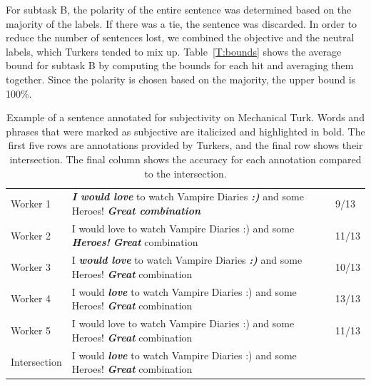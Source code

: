 For subtask B, the polarity of the entire sentence was determined based on the majority of the labels. If there was a tie, the sentence was discarded. In order to reduce the number of sentences lost, we combined the objective and the neutral labels, which Turkers tended to mix up. Table~\ref{T:bounds} shows the average bound for subtask B by computing the bounds for each hit and averaging them together. Since the polarity is chosen based on the majority, the upper bound is 100\%.

 \begin{table}[t]
\centering
\small
\begin{tabular}{|l|l|l|}
\hline
Worker 1 & \textbf{\textit{I would love}} to watch Vampire Diaries \textbf{\textit{:)}} and some Heroes! \textbf{\textit{Great combination}} & 9/13 \\
Worker 2 & I would love to watch Vampire Diaries :) and some \textbf{\textit{Heroes!}} \textbf{\textit{Great}} combination & 11/13 \\
Worker 3 & I \textbf{\textit{would love}} to watch Vampire Diaries \textbf{\textit{:)}} and some Heroes! \textbf{\textit{Great}} combination & 10/13 \\
Worker 4 & I would \textbf{\textit{love}} to watch Vampire Diaries :) and some Heroes! \textbf{\textit{Great}} combination & 13/13 \\
Worker 5 & I would love to watch Vampire Diaries :) and some Heroes! \textbf{\textit{Great}} combination & 11/13\\
\hline
Intersection & I would \textbf{\textit{love}} to watch Vampire Diaries :) and some Heroes! \textbf{\textit{Great}} combination & \\
\hline
\end{tabular}
\caption{Example of a sentence annotated for subjectivity on Mechanical Turk. Words and phrases that were marked as subjective are italicized and highlighted in bold. The first five rows are annotations provided by Turkers, and the final row shows their intersection. The final column shows the accuracy for each annotation compared to the intersection.}
\label{T:Annotation}
\end{table}
